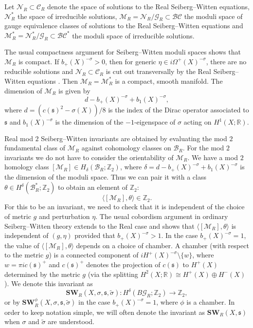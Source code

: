 \documentclass{amsart}
\theoremstyle{definition}
\theoremstyle{remark}
\numberwithin{equation}{section}
\begin{document}
Let $\mathcal{N}_R \subset \mathcal{C}_R$ denote the space of solutions to the Real Seiberg--Witten equations, $\mathcal{N}^*_R$ the space of irreducible solutions, $\mathcal{M}_R = \mathcal{N}_R/\mathcal{G}_R \subset \mathcal{BC}$ the moduli space of gauge equivalence classes of solutions to the Real Seiberg--Witten equations and $\mathcal{M}^*_R = \mathcal{N}^*_R/\mathcal{G}_R \subset \mathcal{BC}^*$ the moduli space of irreducible solutions.

The usual compactness argument for Seiberg--Witten moduli spaces shows that $\mathcal{M}_R$ is compact. If $b_+(X)^{-\sigma} > 0$, then for generic $\eta \in i \Omega^+(X)^{-\sigma}$, there are no reducible solutions and $\mathcal{N}_R \subset \mathcal{C}_R$ is cut out transversally by the Real Seiberg--Witten equations \cite[]{tw}. Then $\mathcal{M}_R = \mathcal{M}_R^*$ is a compact, smooth manifold. The dimension of $\mathcal{M}_R$ is given by 
\[
d - b_+(X)^{-\sigma} + b_1(X)^{-\sigma},
\]
where $d = (c(\mathfrak{s})^2 - \sigma(X))/8$ is the index of the Dirac operator associated to $\mathfrak{s}$ and $b_1(X)^{-\sigma}$ is the dimension of the $-1$-eigenspace of $\sigma$ acting on $H^1(X ; \mathbb{R})$.

Real mod $2$ Seiberg--Witten invariants are obtained by evaluating the mod $2$ fundamental class of $\mathcal{M}_R$ against cohomology classes on $\mathcal{B}_R$. For the mod $2$ invariants we do not have to consider the orientability of $\mathcal{M}_R$. We have a mod $2$ homology class $[\mathcal{M}_R] \in H_{\delta}( \mathcal{B}_R ; \mathbb{Z}_2)$, where $\delta = d - b_+(X)^{-\sigma} + b_1(X)^{-\sigma}$ is the dimension of the moduli space. Thus we can pair it with a class $\theta \in H^\delta( \mathcal{B}_R^* ; \mathbb{Z}_2)$ to obtain an element of $\mathbb{Z}_2$:
\[
\langle [\mathcal{M}_R] , \theta \rangle \in \mathbb{Z}_2.
\]
For this to be an invariant, we need to check that it is independent of the choice of metric $g$ and perturbation $\eta$. The usual cobordism argument in ordinary Seiberg--Witten theory extends to the Real case and shows that $\langle [\mathcal{M}_R] , \theta \rangle$ is independent of $(g, \eta)$ provided that $b_+(X)^{-\sigma} > 1$. In the case $b_+(X)^{-\sigma} = 1$, the value of $\langle [\mathcal{M}_R] , \theta \rangle$ depends on a choice of chamber. A chamber (with respect to the metric $g$) is a connected component of $i H^+(X)^{-\sigma} \setminus \{ w \}$, where $w = \pi i c(\mathfrak{s})^+$ and $c(\mathfrak{s})^+$ denotes the projection of $c(\mathfrak{s})$ to $H^+(X)$ determined by the metric $g$ (via the splitting $H^2(X ; \mathbb{R}) \cong H^+(X) \oplus H^-(X)$). We denote this invariant as
\[
\mathbf{SW}_R(X , \sigma , \mathfrak{s} , \widetilde{\sigma} ) : H^\delta( B\mathcal{G}_R ; \mathbb{Z}_2 ) \to \mathbb{Z}_2,
\]
or by $\mathbf{SW}_R^\phi(X , \sigma , \mathfrak{s} , \widetilde{\sigma} )$ in the case $b_+(X)^{-\sigma} = 1$, where $\phi$ is a chamber. In order to keep notation simple, we will often denote the invariant as $\mathbf{SW}_R(X , \mathfrak{s})$ when $\sigma$ and $\widetilde{\sigma}$ are understood.
\end{document}
